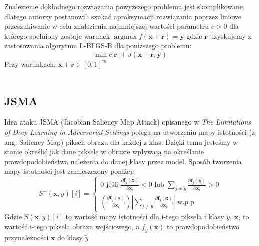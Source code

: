 \documentclass[
    left=2.5cm,         %
    right=2.5cm,        %
    top=2.5cm,          %
    bottom=3cm,         %
    bindingoffset=6mm,  %
    nohyphenation=false %
]{eiti/eiti-thesis}
\renewcommand{\vec}[1]{\mathbf{#1}}
\DeclareMathOperator{\argmax}{\operatorname*{argmax}} %
\begin{document}
Znalezienie dokładnego rozwiązania powyższego problemu jest skomplikowane, dlatego autorzy postanowili szukać aproksymacji
rozwiązania poprzez liniowe przeszukiwanie w celu znalezienia najmniejszej wartości parametru $c > 0$ dla którego spełniony
zostaje warunek $\argmax f(\vec{x}+\vec{r}) = \vec{\widetilde{y}}$ gdzie $\vec{r}$ uzyskujemy z zastosowania algorytmu L-BFGS-B dla poniższego problemu:
\begin{equation}\label{l-bfgs-b-equation}
    \min{c| \vec{r}| + J(\vec{x} + \vec{r}, \vec{\widetilde{y}})}
\end{equation}
Przy warunkach: $\vec{x}+\vec{r} \in [0,1]^{m}$
\\~\\


\subsection{JSMA}
Idea ataku JSMA (Jacobian Saliency Map Attack) opisanego w
\textit{The Limitations of Deep Learning in Adversarial Settings}\cite{DBLP:journals/corr/PapernotMJFCS15}
polega na utworzeniu mapy istotności (z ang. Saliency Map) pikseli obrazu dla każdej z klas.
Dzięki temu jesteśmy w stanie określić jak dane piksele w obrazie wpływają na określanie prawdopodobieństwa należenia
do danej klasy przez model. Sposób tworzenia mapy istotności jest zamieszczony poniżej:
\begin{equation}\label{jsma+}
S^{+} ( \vec{ x }, \widetilde{y} ) [ i ] = \left\{
\begin{array}
{ c } { 0 \text { jeśli } \frac { \partial \mathbf {f} _ { \widetilde{y} } ( \mathbf {x} ) } { \partial \mathbf {x} _ { i } } < 0 \text { lub } \sum _ { j \neq \widetilde{y} } \frac { \partial \mathbf {f} _ { j } ( \mathbf {x} ) } { \partial \mathbf {x} _ { i } } > 0 } \\
{ \left( \frac { \partial \mathbf {f} _ { \widetilde{y} } ( \mathbf {x} ) } { \partial \mathbf {x} _ { i } } \right) \left| \sum _ { j \neq \widetilde{y} } \frac { \partial \mathbf {f} _ { j } ( \mathbf {x} ) } { \partial \mathbf {x} _ { i } } \right| \text { w.p.p } } \end{array} \right.
\end{equation}
Gdzie \( S(\vec{x}, \widetilde{y})[i] \) to wartość mapy istotności dla i-tego piksela i klasy $\widetilde{y}$,
$\vec{x}_i$ to wartość i-tego piksela obrazu wejściowego, a
$f_{\widetilde{y}}(\vec{x})$ to prawdopodobieństwo przynależności $\vec{x}$ do klasy $\widetilde{y}$
\\~\\
\end{document}
